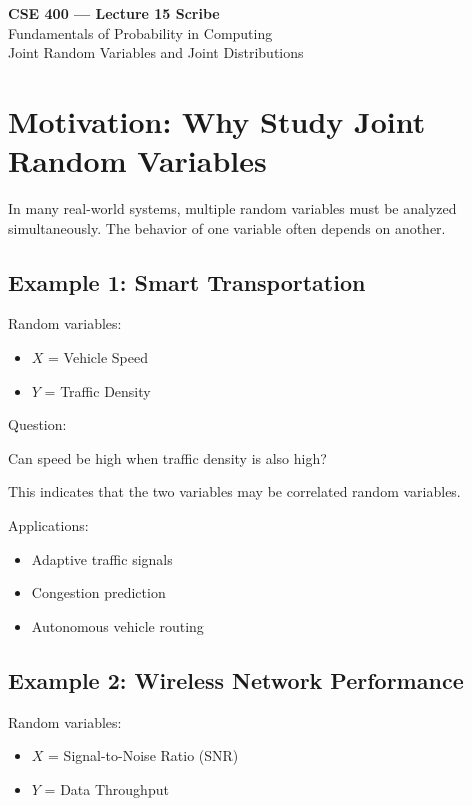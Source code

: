 \documentclass[11pt]{article}
\begin{document}
\begin{center}
{\Large \textbf{CSE 400 — Lecture 15 Scribe}}\\
\vspace{0.2em}
Fundamentals of Probability in Computing\\
Joint Random Variables and Joint Distributions
\end{center}

\section{Motivation: Why Study Joint Random Variables}

In many real-world systems, multiple random variables must be analyzed simultaneously.  
The behavior of one variable often depends on another.

\subsection*{Example 1: Smart Transportation}

Random variables:
\begin{itemize}[noitemsep]
\item $X$ = Vehicle Speed
\item $Y$ = Traffic Density
\end{itemize}

Question:

Can speed be high when traffic density is also high?

This indicates that the two variables may be correlated random variables.

Applications:
\begin{itemize}[noitemsep]
\item Adaptive traffic signals
\item Congestion prediction
\item Autonomous vehicle routing
\end{itemize}

\subsection*{Example 2: Wireless Network Performance}

Random variables:
\begin{itemize}[noitemsep]
\item $X$ = Signal-to-Noise Ratio (SNR)
\item $Y$ = Data Throughput
\end{itemize}
\end{document}
